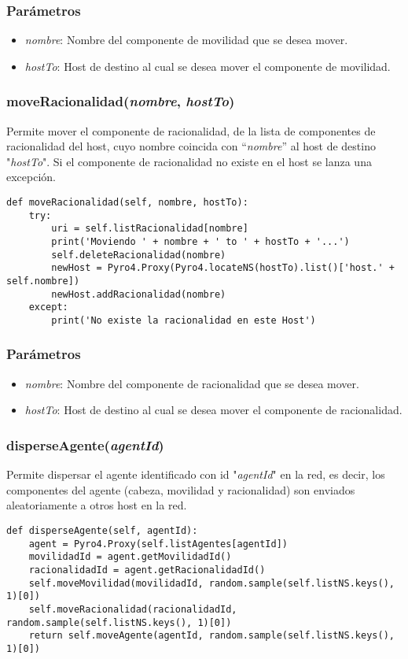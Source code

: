 \documentclass{article}
\begin{document}
\subsubsection*{Parámetros}
\begin{itemize}
\item \textit{nombre}: Nombre del componente de movilidad que se desea mover.
\item \textit{hostTo}: Host de destino al cual se desea mover el componente de movilidad.
\end{itemize}
\subsubsection{\textbf{moveRacionalidad}(\textit{nombre}, \textit{hostTo})}
Permite mover el componente de racionalidad, de la lista de componentes de racionalidad del host, cuyo nombre coincida con ``\textit{nombre}'' al host de destino "\textit{hostTo}". Si el componente de racionalidad no existe en el host se lanza una excepción.
\begin{lstlisting}
def moveRacionalidad(self, nombre, hostTo):  
	try:
		uri = self.listRacionalidad[nombre]
		print('Moviendo ' + nombre + ' to ' + hostTo + '...')
        self.deleteRacionalidad(nombre)
		newHost = Pyro4.Proxy(Pyro4.locateNS(hostTo).list()['host.' + self.nombre])
        newHost.addRacionalidad(nombre)
	except:
    	print('No existe la racionalidad en este Host')
\end{lstlisting}
\subsubsection*{Parámetros}
\begin{itemize}
\item \textit{nombre}: Nombre del componente de racionalidad que se desea mover.
\item \textit{hostTo}: Host de destino al cual se desea mover el componente de racionalidad.
\end{itemize}
\subsubsection{\textbf{disperseAgente}(\textit{agentId})}
Permite dispersar el agente identificado con id "\textit{agentId}" en la red, es decir, los componentes del agente (cabeza, movilidad y racionalidad) son enviados aleatoriamente a otros host en la red.
\begin{lstlisting}
def disperseAgente(self, agentId):
	agent = Pyro4.Proxy(self.listAgentes[agentId])
    movilidadId = agent.getMovilidadId()
	racionalidadId = agent.getRacionalidadId()
    self.moveMovilidad(movilidadId, random.sample(self.listNS.keys(), 1)[0])
	self.moveRacionalidad(racionalidadId, random.sample(self.listNS.keys(), 1)[0])
    return self.moveAgente(agentId, random.sample(self.listNS.keys(), 1)[0])
\end{lstlisting}
\end{document}
